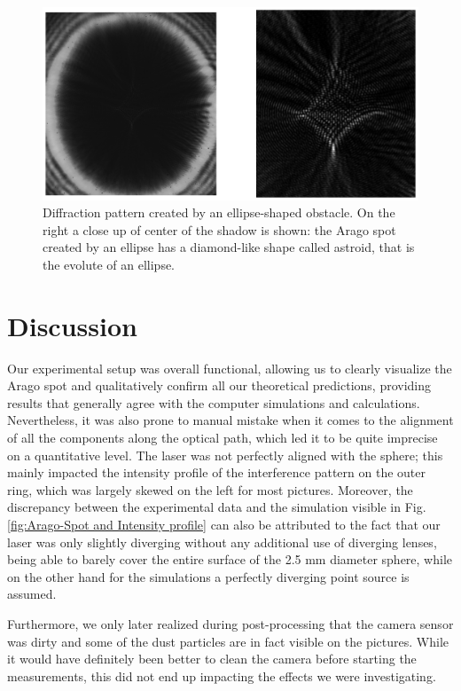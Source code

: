 \documentclass[11pt,a4paper]{article}
\begin{document}
\begin{figure}[H]
    \centering
    \includegraphics[width=0.6\linewidth]{1 - Arago Spot/Images/ellipse.pdf}
    \caption{Diffraction pattern created by an ellipse-shaped obstacle. On the right a close up of center of the shadow is shown: the Arago spot created by an ellipse has a diamond-like shape called astroid, that is the evolute of an ellipse.}
    \label{fig:ellipse}
\end{figure}

\vspace{1px}
\section{Discussion}

Our experimental setup was overall functional, allowing us to clearly visualize the Arago spot and  qualitatively confirm all our theoretical predictions, providing results that generally agree with the computer simulations and calculations. Nevertheless, it was also prone to manual mistake when it comes to the alignment of all the components along the optical path, which led it to be quite imprecise on a quantitative level. The laser was not perfectly aligned with the sphere; this mainly impacted the intensity profile of the interference pattern on the outer ring, which was largely skewed on the left for most pictures. Moreover, the discrepancy between the experimental data and the simulation visible in Fig. \ref{fig:Arago-Spot and Intensity profile} can also be attributed to the fact that our laser was only slightly diverging without any additional use of diverging lenses, being able to barely cover the entire surface of the 2.5 mm diameter sphere, while on the other hand for the simulations a perfectly diverging point source is assumed. 

Furthermore, we only later realized during post-processing that the camera sensor was dirty and some of the dust particles are in fact visible on the pictures. While it would have definitely been better to clean the camera before starting the measurements, this did not end up impacting the effects we were investigating. 
\end{document}
